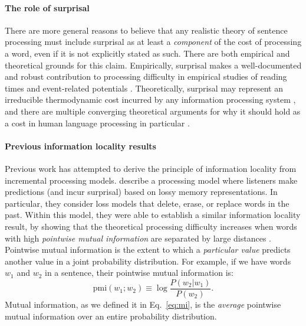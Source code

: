 \paragraph{The role of surprisal}

There are more general reasons to believe that any realistic theory of sentence processing must include surprisal as at least a \emph{component} of the cost of processing a word, even if it is not explicitly stated as such. 
There are both empirical and theoretical grounds for this claim.
Empirically, surprisal makes a well-documented and robust contribution to processing difficulty in empirical studies of reading times and event-related potentials \citep{smith2013effect,frank2016erp}. 
Theoretically, surprisal may represent an irreducible thermodynamic cost incurred by any information processing system \citep{landauer,still2012thermodynamic,zenon2019information}, and there are multiple converging theoretical arguments for why it should hold as a cost in human language processing in particular \cite[see][for a review]{levy2013memory}. 




\paragraph{Previous information locality results}

Previous work has attempted to derive the principle of information locality from incremental processing models. 
\citet{futrell2020lossy} describe a processing model where listeners make predictions (and incur surprisal) based on lossy memory representations.
In particular, they consider loss models that delete, erase, or replace words in the past.
Within this model, they were able to establish a similar information locality result, by showing that the theoretical processing difficulty increases when words with high \emph{pointwise mutual information} are separated by large distances \citep{futrell-noisy-context-2017,futrell2019information}. Pointwise mutual information is the extent to which a \emph{particular value} predicts another value in a joint probability distribution. For example, if we have words $w_1$ and $w_2$ in a sentence, their pointwise mutual information is:
\begin{equation*}
    \text{pmi}(w_1; w_2) \equiv \log \frac{P(w_2|w_1)}{P(w_2)}.
\end{equation*}
Mutual information, as we defined it in Eq.~\ref{eq:mi}, is the \emph{average} pointwise mutual information over an entire probability distribution.

